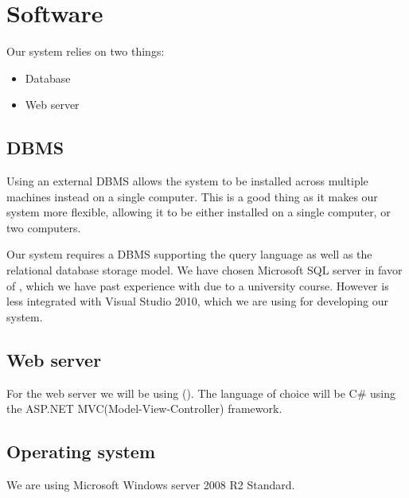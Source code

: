 \section{Software}
\label{sec:software}

Our system relies on two things:

\begin{itemize}
	\item Database
	\item Web server
\end{itemize}

\subsection{DBMS}
\label{subsec:dbms}

Using an external DBMS allows the system to be installed across multiple machines instead on a single computer. This is a good thing as it makes our system more flexible, allowing it to be either installed on a single computer, or two computers.

Our system requires a DBMS supporting the query language \sql[] as well as the relational database storage model.
We have chosen Microsoft SQL server in favor of \posgresql[], which we have past experience with due to a university course. However \posgresql[] is less integrated with Visual Studio 2010, which we are using for developing our system. 

\subsection{Web server}
\label{subsec:webserver}

For the web server we will be using  \wholeiis[] (\iis[]). 
The language of choice will be C\# using the ASP.NET MVC(Model-View-Controller) framework. \\


\subsection{Operating system}
\label{subsec:operating_system}

We are using Microsoft Windows server 2008 R2 Standard. 